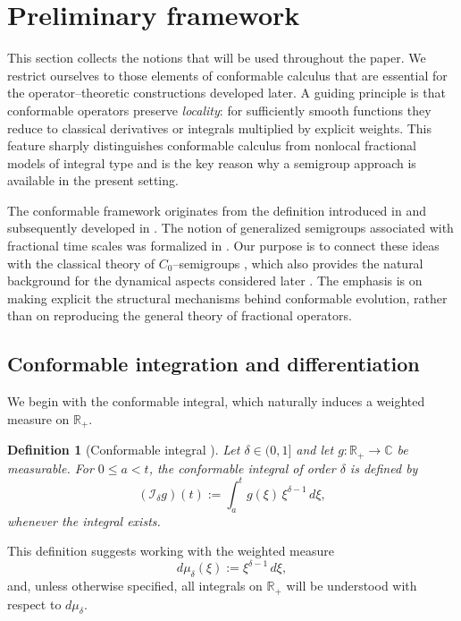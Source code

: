 \documentclass[preprint,12pt]{elsarticle}
\newtheorem{definition}{Definition}
\newcommand{\R}{\mathbb {R}}
\newcommand{\C}{\mathbb {C}}
\begin{document}
\section{Preliminary framework}\label{sec2}
 This section collects the notions that will be used throughout the paper. We restrict ourselves to those elements of conformable calculus that are essential for the operator--theoretic constructions developed later. A guiding principle is that conformable operators preserve \emph{locality}: for sufficiently smooth functions they reduce to classical derivatives or integrals multiplied by explicit weights. This feature sharply distinguishes conformable calculus from nonlocal fractional models of integral type \cite{kilbas2006,mainardi2010,tarasov2018} and is the key reason why a semigroup approach is available in the present setting.

The conformable framework originates from the definition introduced in \cite{khalil2014} and subsequently developed in \cite{abdeljawad2015,abdeljawad2016}. The notion of generalized semigroups associated with fractional time scales
was formalized in \cite{abdeljawad2015semigroup}. Our purpose is to connect these ideas with the classical theory of $C_0$--semigroups \cite{pazy1983,pruss1993,engel2000}, which also provides the natural background for the dynamical aspects considered later \cite{desch1997}. The emphasis is on making explicit the structural mechanisms behind conformable evolution, rather than on reproducing the general theory of fractional operators.

\subsection{Conformable integration and differentiation}

We begin with the conformable integral, which naturally induces a weighted
measure on $\R_+$.

\begin{definition}[Conformable integral {\cite{khalil2014,abdeljawad2015}}]
Let $\delta\in(0,1]$ and let $g:\R_+\to\C$ be measurable.
For $0\le a<t$, the conformable integral of order $\delta$ is defined by
\[
(\mathcal{I}_\delta g)(t)
:=
\int_a^t g(\xi)\,\xi^{\delta-1}\,d\xi,
\]
whenever the integral exists.
\end{definition}

This definition suggests working with the weighted measure
\[
d\mu_\delta(\xi):=\xi^{\delta-1}\,d\xi,
\]
and, unless otherwise specified, all integrals on $\R_+$ will be understood
with respect to $d\mu_\delta$.
\end{document}
